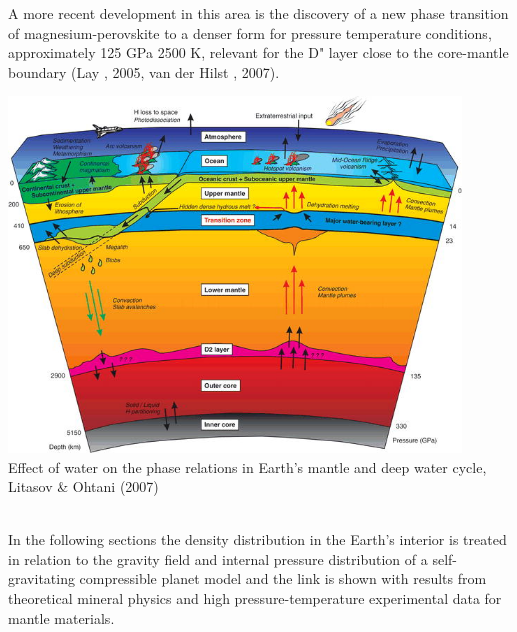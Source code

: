 A more recent development in this area is the discovery of a new phase
transition of magnesium-perovskite to a denser form for pressure
temperature conditions, approximately 125 GPa 2500 K, relevant for the D"
layer close to the core-mantle boundary
(Lay \etal, 2005, van der Hilst \etal, 2007).

\begin{center}
\includegraphics[width=12cm]{images/gravity/effect}\\
{\captionfont Effect of water on the phase relations in Earth's mantle and deep water cycle,\\
Litasov \& Ohtani (2007) \cite{lioh07}} 
\end{center}


~\\
In the following sections the density distribution in the
Earth's interior is treated in relation to the gravity field
and internal pressure distribution of a self-gravitating compressible
planet model and the link is shown with results from theoretical
mineral physics and high pressure-temperature experimental data for
mantle materials.
